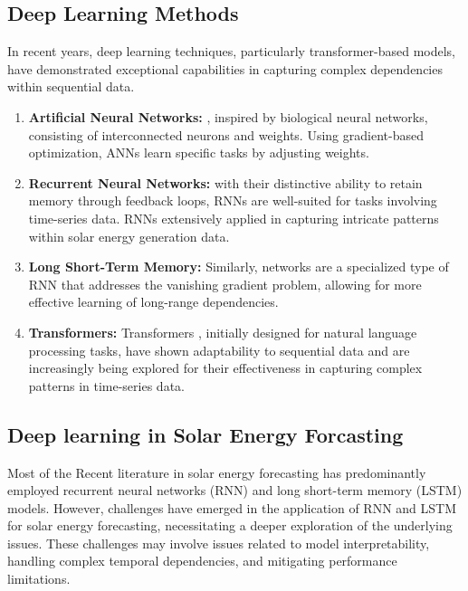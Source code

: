 \documentclass[12pt]{uomthesis}
\begin{document}
\subsection{Deep Learning Methods}
In recent years, deep learning techniques, particularly transformer-based models, have demonstrated exceptional capabilities in capturing complex dependencies within sequential data. 
\begin{enumerate}
    \item \textbf{Artificial Neural Networks:}  \cite{jebli2021deep,abuella2015solar,zhou2021deep,lima2020improving}, inspired by biological neural networks, consisting of interconnected neurons and weights. Using gradient-based optimization, ANNs learn specific tasks by adjusting weights.
    \item \textbf{Recurrent Neural Networks:}  \cite{li2019recurrent} with their distinctive ability to retain memory through feedback loops, RNNs are well-suited for tasks involving time-series data. RNNs extensively applied in capturing intricate patterns within solar energy generation data.
    \item \textbf{Long Short-Term Memory:} Similarly,  \cite{liu2021simplified,hossain2020short,massaoudi2019novel,abdel2019accurate,lim2022solar} networks are a specialized type of RNN that addresses the vanishing gradient problem, allowing for more effective learning of long-range dependencies.
    \item \textbf{Transformers:} Transformers \cite{lopezsantos2022temporalfusion,munsif2023ctnet, alali2023solar,sherozbek2023transformersbased, wen2022transformers, zeng2023transformers}, initially designed for natural language processing tasks, have shown adaptability to sequential data and are increasingly being explored for their effectiveness in capturing complex patterns in time-series data.
\end{enumerate}

\subsection{Deep learning in Solar Energy Forcasting}

Most of the Recent literature in solar energy forecasting has predominantly employed recurrent neural networks (RNN) and long short-term memory (LSTM) models. However, challenges have emerged in the application of RNN and LSTM for solar energy forecasting, necessitating a deeper exploration of the underlying issues. These challenges may involve issues related to model interpretability, handling complex temporal dependencies, and mitigating performance limitations.
\end{document}
